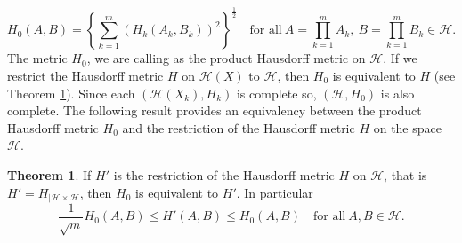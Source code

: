 \documentclass[10pt]{amsart}
\theoremstyle{definition}
\newtheorem{thm}{Theorem}[section]
\begin{document}
	\begin{equation}
		H_0(A,B)=\left\{\sum_{k=1}^{m}(H_k(A_k,B_k))^2\right\}^{\frac{1}{2}}\quad \mbox{for all}~A=\prod_{k=1}^mA_k,~B=\prod_{k=1}^mB_k\in \mathscr{H}. \label{phm} 	
	\end{equation}
	The metric $H_0$, we are calling as the product Hausdorff metric on $\mathscr{H}$.  If we restrict the Hausdorff metric $H$ on $\mathscr{H}(X)$ to $\mathscr{H}$, then  $H_0$ is equivalent to $H$ (see Theorem \ref{evt}).
	Since each $(\mathscr{H}(X_k),H_k)$ is complete so, $(\mathscr{H},H_0)$ is also complete. The following result provides an equivalency between the product Hausdorff metric $H_0$ and the restriction of the Hausdorff metric $H$ on the space $\mathscr{H}$.
	\begin{thm}
		If $H'$ is the restriction of the Hausdorff metric $H$ on $\mathscr{H}$, that is $H'=H_{|\mathscr{H}\times\mathscr{H}}$, then $H_0$ is equivalent to $H'$. In particular $$\frac{1}{\sqrt{m}}H_0(A,B)\leq H'(A,B)\leq H_0(A,B)\quad \mbox{for all}~A,B\in\mathscr{H}.$$
		\label{evt}
	\end{thm}
\end{document}
